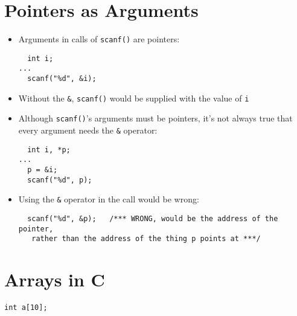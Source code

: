 \documentclass{article}
\begin{document}
\section{Pointers as Arguments}
\begin{itemize}
\item Arguments in calls of \verb!scanf()! are pointers:

\begin{verbatim}
  int i;
...
  scanf("%d", &i);
\end{verbatim}

\item Without the \verb!&!, \verb!scanf()! would be supplied with the value of \verb!i!

\item Although \verb!scanf()!'s arguments must be pointers, it's not always true that every argument needs the \verb!&! operator:
\begin{verbatim}
  int i, *p;
...
  p = &i;
  scanf("%d", p);
\end{verbatim}

\item Using the \verb!&! operator in the call would be wrong:
\begin{verbatim}
  scanf("%d", &p);   /*** WRONG, would be the address of the pointer,
   rather than the address of the thing p points at ***/
\end{verbatim}
\end{itemize}



\section{Arrays in C}
\begin{verbatim}
int a[10];
\end{verbatim}
\end{document}

